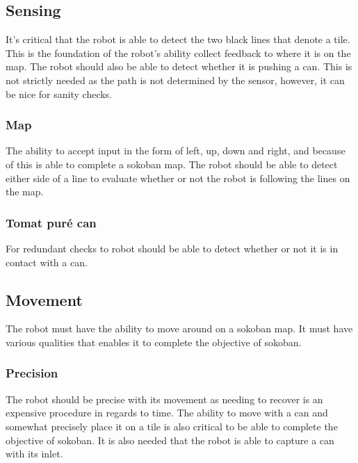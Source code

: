 \documentclass[../../main.tex]{subfiles}
\begin{document}
\subsection{Sensing}%
\label{sub:sensing}

It's critical that the robot is able to detect the two black lines that denote a tile. This is the foundation of the robot's ability collect feedback to where it is on the map.
The robot should also be able to detect whether it is pushing a can. This is not strictly needed as the path is not determined by the sensor, however, it can be nice for sanity checks.

\subsubsection{Map}%
\label{ssub:map}

The ability to accept input in the form of left, up, down and right, and because of this is able to complete a sokoban map.
The robot should be able to detect either side of a line to evaluate whether or not the robot is following the lines on the map.

\subsubsection{Tomat puré can}%
\label{ssub:tomat_pure_can}

For redundant checks to robot should be able to detect whether or not it is in contact with a can.

\subsection{Movement}%
\label{sub:movement}

The robot must have the ability to move around on a sokoban map. It must have various qualities that enables it to complete the objective of sokoban.

\subsubsection{Precision}%
\label{ssub:precision}

The robot should be precise with its movement as needing to recover is an expensive procedure in regards to time.
The ability to move with a can and somewhat precisely place it on a tile is also critical to be able to complete the objective of sokoban. It is also needed that the robot is able to capture a can with its inlet.
\end{document}
